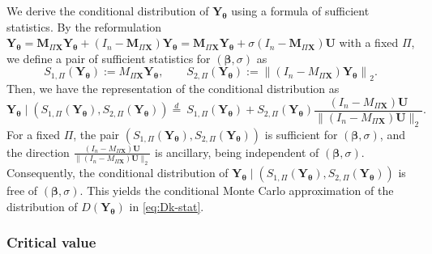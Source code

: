 \documentclass[11pt, reqno]{amsart}
\newcommand{\1}{\mbox{1}\hspace{-0.25em}\mbox{l}}
\theoremstyle{definition}\newtheorem{problem}{Problem}[section]
\theoremstyle{definition}\newtheorem{definition}[problem]{Definition}
\theoremstyle{remark}\newtheorem{assumption}{Assumption}
\theoremstyle{remark}\newtheorem{remark}[problem]{Remark}
\theoremstyle{definition}\newtheorem{example}[problem]{Example}
\theoremstyle{plain}\newtheorem{theorem}[problem]{Theorem}
\theoremstyle{plain}\newtheorem{question}[problem]{Question}
\theoremstyle{plain}\newtheorem{lemma}[problem]{Lemma}
\theoremstyle{plain}\newtheorem{proposition}[problem]{Proposition}
\theoremstyle{plain}\newtheorem{corollary}[problem]{Corollary}
\theoremstyle{plain}\newtheorem{conjecture}[problem]{Conjecture}
\begin{document}
We derive the conditional distribution of $ \bm{Y}_{\bm \theta}$ using a formula of sufficient statistics.
By the reformulation $
\bm{Y}_{\bm{\theta}} = \bm{M}_{\Pi \bm{X}} \bm{Y}_{\bm{\theta}} + (I_n - \bm{M}_{\Pi \bm{X}})\bm{Y}_{\bm{\theta}} = \bm{M}_{\Pi \bm{X}} \bm{Y}_{\bm{\theta}} + \sigma(I_n - \bm{M}_{\Pi \bm{X}})\bm{U}
$ with a fixed $\Pi$, 
we define a pair of sufficient statistics for $(\bm \beta, \sigma)$ as
\begin{equation}\label{eq:sufficient statistics}
    S_{1,\Pi}(\bm Y_{\bm \theta}):=M_{\Pi\bm X}\bm Y_{\bm \theta},\qquad S_{2,\Pi}(\bm Y_{\bm \theta}):=\left\|(I_n-M_{\Pi\bm X})\bm Y_{\bm \theta}\right\|_2.
\end{equation}
Then, 
we have the representation of the conditional distribution as
\begin{equation}\label{eq:conditional-representation}
    \bm Y_{\bm \theta}  \mid \left(S_{1,\Pi}(\bm Y_{\bm \theta}),S_{2,\Pi}(\bm Y_{\bm \theta})\right)
     \overset{d}{=}\
    S_{1,\Pi}(\bm Y_{\bm \theta})+S_{2,\Pi}(\bm Y_{\bm \theta})\frac{(I_n-M_{\Pi\bm X})\bm U}{\|(I_n-M_{\Pi\bm X})\bm U\|_2}.
\end{equation}
For a fixed $\Pi$, the pair $(S_{1,\Pi}(\bm Y_{\bm \theta}), S_{2,\Pi}(\bm Y_{\bm \theta}))$ is sufficient for $(\bm \beta, \sigma)$, and the direction $\frac{(I_n-M_{\Pi\bm X})\bm U}{\|(I_n-M_{\Pi\bm X})\bm U\|_2}$ is ancillary, being independent of $(\bm \beta, \sigma)$. Consequently, the conditional distribution of $\bm Y_{\bm \theta}  \mid (S_{1,\Pi}(\bm Y_{\bm \theta}),S_{2,\Pi}(\bm Y_{\bm \theta}))$ is free of $(\bm \beta, \sigma)$. This yields the conditional Monte Carlo approximation of the distribution of $D(\bm Y_{\bm \theta})$ in \eqref{eq:Dk-stat}.

\subsubsection{Critical value}
\end{document}
